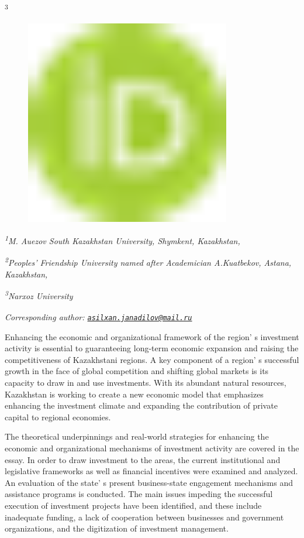 \textsuperscript{3}
\begin{figure}[H]
	\centering
	\includegraphics[width=0.8\textwidth]{media/ekon/image1}
	\caption*{}
\end{figure}


\emph{\textsuperscript{1}M. Auezov South Kazakhstan University,
Shymkent, Kazakhstan,}

\emph{\textsuperscript{2}Peoples'{} Friendship University
named after Academician A.Kuatbekov, Astana, Kazakhstan,}

\emph{\textsuperscript{3}Narxoz University}

\emph{{\bfseries \textsuperscript{\envelope }}Corresponding author:
\href{mailto:asilxan.janadilov@mail.ru}{\nolinkurl{asilxan.janadilov@mail.ru}}}

Enhancing the economic and organizational framework of the
region' s investment activity is essential to
guaranteeing long-term economic expansion and raising the
competitiveness of Kazakhstani regions. A key component of a
region' s successful growth in the face of global
competition and shifting global markets is its capacity to draw in and
use investments. With its abundant natural resources, Kazakhstan is
working to create a new economic model that emphasizes enhancing the
investment climate and expanding the contribution of private capital to
regional economies.

The theoretical underpinnings and real-world strategies for enhancing
the economic and organizational mechanisms of investment activity are
covered in the essay. In order to draw investment to the areas, the
current institutional and legislative frameworks as well as financial
incentives were examined and analyzed. An evaluation of the
state' s present business-state engagement mechanisms and
assistance programs is conducted. The main issues impeding the
successful execution of investment projects have been identified, and
these include inadequate funding, a lack of cooperation between
businesses and government organizations, and the digitization of
investment management.

